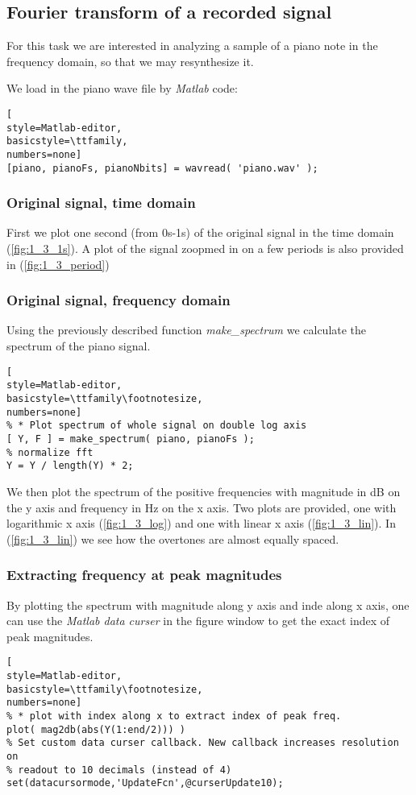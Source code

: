 \subsection{ Fourier transform of a recorded signal }
For this task we are interested in analyzing a sample of a piano note in the
frequency domain, so that we may resynthesize it.

We load in the piano wave file by \emph{Matlab} code:
\begin{lstlisting}[
style=Matlab-editor,
basicstyle=\ttfamily,
numbers=none]
[piano, pianoFs, pianoNbits] = wavread( 'piano.wav' );
\end{lstlisting}


\subsubsection{ Original signal, time domain }
First we plot one second (from 0s-1s) of the original signal in the time domain
(\ref{fig:1_3_1s}).
A plot of the signal zoopmed in on a few periods is also provided in
(\ref{fig:1_3_period})


\subsubsection{ Original signal, frequency domain }
Using the previously described function \emph{make\_spectrum} we calculate the
spectrum of the piano signal.
\begin{lstlisting}[
style=Matlab-editor,
basicstyle=\ttfamily\footnotesize,
numbers=none]
% * Plot spectrum of whole signal on double log axis
[ Y, F ] = make_spectrum( piano, pianoFs );
% normalize fft
Y = Y / length(Y) * 2;
\end{lstlisting}

We then plot the spectrum of the positive
frequencies with magnitude in dB on the y axis and frequency in Hz on the x axis. Two plots are provided, one with
logarithmic x axis (\ref{fig:1_3_log}) and one with linear x axis
(\ref{fig:1_3_lin}). In (\ref{fig:1_3_lin}) we see how the overtones are almost
equally spaced.


\subsubsection{ Extracting frequency at peak magnitudes }
By plotting the spectrum with magnitude along y axis and inde along x axis, one
can use the \emph{Matlab data curser} in the figure window to get the exact
index of peak magnitudes.
\begin{lstlisting}[
style=Matlab-editor,
basicstyle=\ttfamily\footnotesize,
numbers=none]
% * plot with index along x to extract index of peak freq.
plot( mag2db(abs(Y(1:end/2))) )
% Set custom data curser callback. New callback increases resolution on
% readout to 10 decimals (instead of 4)
set(datacursormode,'UpdateFcn',@curserUpdate10);
\end{lstlisting}

